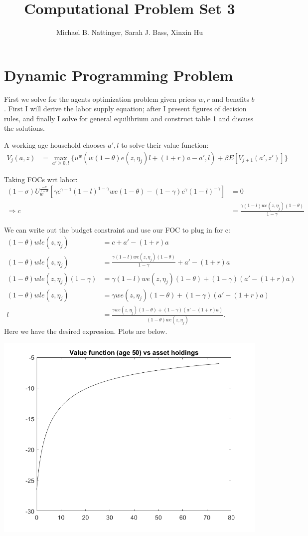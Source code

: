 \documentclass[11pt]{article} %
\title{Computational Problem Set 3}
\author{Michael B. Nattinger, Sarah J. Bass, Xinxin Hu}
\begin{document}
\maketitle

\section{Dynamic Programming Problem}

First we solve for the agents optimization problem given prices $w,r$ and benefits $b$. First I will derive the labor supply equation; after I present figures of decision rules, and finally I solve for general equilibrium and construct table 1 and discuss the solutions.

A working age household chooses $a',l$ to solve their value function:
\begin{align*}
V_{j}(a,z) &= \max_{a'\geq 0, l}\{ u^w(w(1-\theta)e(z,\eta_j)l + (1+r)a - a',l) + \beta E[V_{j+1}(a',z')] \}
\end{align*}

Taking FOCs wrt labor:
\begin{align*}
(1-\sigma) U_w^{\frac{-\sigma}{1-\sigma}}[\gamma c^{\gamma - 1}(1-l)^{1-\gamma}we(1-\theta) - (1-\gamma)c^{\gamma}(1-l)^{-\gamma}] &= 0 \\
\Rightarrow c &= \frac{\gamma (1-l)we(z,\eta_j)(1-\theta)}{1-\gamma} 
\end{align*}

We can write out the budget constraint and use our FOC to plug in for c:
\begin{align*}
(1-\theta)wle(z,\eta_j) &= c + a' - (1+r)a \\
(1-\theta)wle(z,\eta_j) &= \frac{\gamma (1-l)we(z,\eta_j)(1-\theta)}{1-\gamma}  + a' - (1+r)a \\
(1-\theta)wle(z,\eta_j)(1-\gamma) &= \gamma (1-l)we(z,\eta_j)(1-\theta)  + (1-\gamma)(a' - (1+r)a) \\
(1-\theta)wle(z,\eta_j) &= \gamma we(z,\eta_j)(1-\theta)  + (1-\gamma)(a' - (1+r)a)\\
l &= \frac{ \gamma we(z,\eta_j)(1-\theta)  + (1-\gamma)(a' - (1+r)a)}{(1-\theta)we(z,\eta_j)}.
\end{align*}
Here we have the desired expression. Plots are below.

\includegraphics{value}
\end{document}
